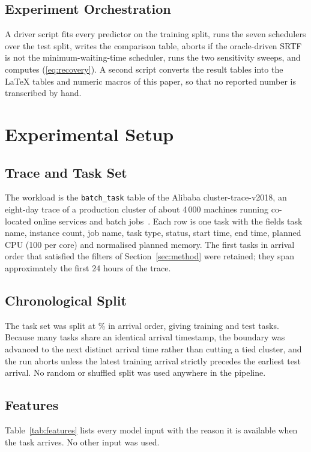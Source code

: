 \documentclass[conference]{IEEEtran}
\begin{document}
\subsection{Experiment Orchestration}
A driver script fits every predictor on the training split, runs the seven
schedulers over the test split, writes the comparison table, aborts if the
oracle-driven SRTF is not the minimum-waiting-time scheduler, runs the two
sensitivity sweeps, and computes (\ref{eq:recovery}). A second script
converts the result tables into the LaTeX tables and numeric macros of this
paper, so that no reported number is transcribed by hand.

\section{Experimental Setup}
\label{sec:setup}

\subsection{Trace and Task Set}
The workload is the \texttt{batch\_task} table of the Alibaba
cluster-trace-v2018, an eight-day trace of a production cluster of about
4\,000 machines running co-located online services and batch
jobs~\cite{cheng_characterizing_2018,unknown_characterizing_2020}. Each row
is one task with the fields task name, instance count, job name, task type,
status, start time, end time, planned CPU (100 per core) and normalised
planned memory. The first \nTasks{} tasks in arrival order that satisfied
the filters of Section~\ref{sec:method} were retained; they span
approximately the first 24 hours of the trace.

\subsection{Chronological Split}
The task set was split at \trainPercent\% in arrival order, giving
\nTrainTasks{} training and \nTestTasks{} test tasks. Because many tasks
share an identical arrival timestamp, the boundary was advanced to the next
distinct arrival time rather than cutting a tied cluster, and the run aborts
unless the latest training arrival strictly precedes the earliest test
arrival. No random or shuffled split was used anywhere in the pipeline.

\subsection{Features}
Table~\ref{tab:features} lists every model input with the reason it is
available when the task arrives. No other input was used.
\end{document}

